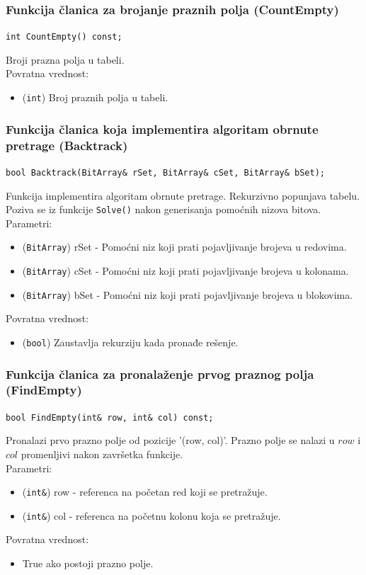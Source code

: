 \documentclass[a4paper]{article}
\begin{document}
    \subsubsection{Funkcija članica za brojanje praznih polja (CountEmpty)}
    \texttt{int CountEmpty() const;}
    \par Broji prazna polja u tabeli.\\
    Povratna vrednost:
    \begin{itemize}
        \item (\texttt{int}) Broj praznih polja u tabeli.
    \end{itemize}

    \subsubsection{Funkcija članica koja implementira algoritam obrnute pretrage (Backtrack)}
    {\parindent0pt
    \texttt{bool Backtrack(BitArray\& rSet, BitArray\& cSet, BitArray\& bSet);}
    }
    \par Funkcija implementira algoritam obrnute pretrage. Rekurzivno popunjava tabelu. Poziva se iz funkcije \texttt{Solve()} nakon generisanja pomoćnih nizova bitova.
    Parametri:
    \begin{itemize}
        \item (\texttt{BitArray}) rSet - Pomoćni niz koji prati pojavljivanje brojeva u redovima.
        \item (\texttt{BitArray}) cSet - Pomoćni niz koji prati pojavljivanje brojeva u kolonama.
        \item (\texttt{BitArray}) bSet - Pomoćni niz koji prati pojavljivanje brojeva u blokovima.
    \end{itemize}
    Povratna vrednost:
    \begin{itemize}
        \item (\texttt{bool}) Zaustavlja rekurziju kada pronađe rešenje.
    \end{itemize}

    \subsubsection{Funkcija članica za pronalaženje prvog praznog polja (FindEmpty)}
	\texttt{bool FindEmpty(int\& row, int\& col) const;}
    \par Pronalazi prvo prazno polje od pozicije '(row, col)'. Prazno polje se nalazi u $row$ i $col$ promenljivi nakon završetka funkcije.\\
    Parametri:
    \begin{itemize}
        \item (\texttt{int\&}) row - referenca na početan red koji se pretražuje.
        \item (\texttt{int\&}) col - referenca na početnu kolonu koja se pretražuje.
    \end{itemize}
    Povratna vrednost:
    \begin{itemize}
        \item True ako postoji prazno polje.
    \end{itemize}
\end{document}
